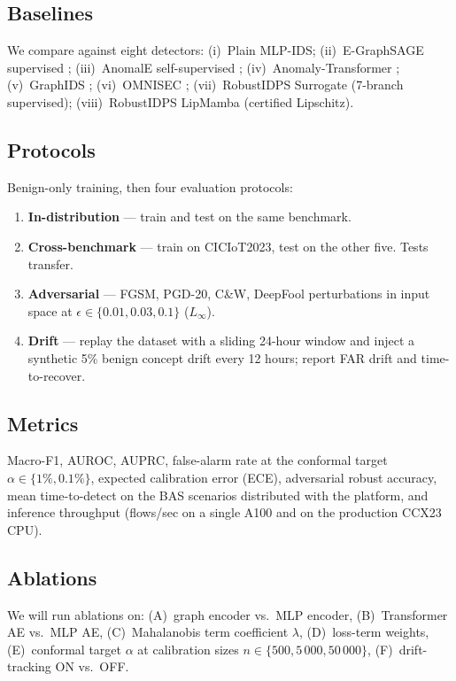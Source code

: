 \documentclass[journal,twoside]{IEEEtran}
\begin{document}
\subsection{Baselines}
We compare against eight detectors:
(i)~Plain MLP-IDS;
(ii)~E-GraphSAGE supervised \cite{lo2022};
(iii)~AnomalE self-supervised \cite{caville2022anomalE};
(iv)~Anomaly-Transformer \cite{xu2022anomalyTrans};
(v)~GraphIDS \cite{nguyen2025graphids};
(vi)~OMNISEC \cite{omnisec2025};
(vii)~RobustIDPS Surrogate (7-branch supervised);
(viii)~RobustIDPS LipMamba (certified Lipschitz).

\subsection{Protocols}
Benign-only training, then four evaluation protocols:
\begin{enumerate}[leftmargin=1.5em]
  \item \textbf{In-distribution} — train and test on the same benchmark.
  \item \textbf{Cross-benchmark} — train on CICIoT2023, test on the
        other five.  Tests transfer.
  \item \textbf{Adversarial} — FGSM, PGD-20, C\&W, DeepFool perturbations
        in input space at $\epsilon \in \{0.01, 0.03, 0.1\}$ ($L_\infty$).
  \item \textbf{Drift} — replay the dataset with a sliding 24-hour
        window and inject a synthetic 5\% benign concept drift every
        12 hours; report FAR drift and time-to-recover.
\end{enumerate}

\subsection{Metrics}
Macro-F1, AUROC, AUPRC, false-alarm rate at the conformal target
$\alpha \in \{1\%, 0.1\%\}$, expected calibration error (ECE),
adversarial robust accuracy, mean time-to-detect on the BAS scenarios
distributed with the platform, and inference throughput
(flows/sec on a single A100 and on the production CCX23 CPU).

\subsection{Ablations}
We will run ablations on:
(A)~graph encoder vs.\ MLP encoder,
(B)~Transformer AE vs.\ MLP AE,
(C)~Mahalanobis term coefficient $\lambda$,
(D)~loss-term weights,
(E)~conformal target $\alpha$ at calibration sizes $n \in \{500, 5\,000, 50\,000\}$,
(F)~drift-tracking ON vs.\ OFF.
\end{document}
